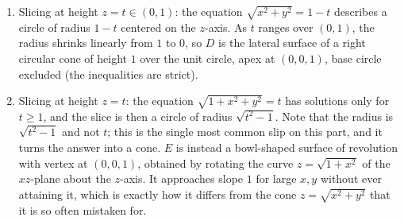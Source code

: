 \begin{exercisesolution}
\begin{enumerate}[label=\textbf{(\alph*)}]
\begin{center}
    \end{center}
  \item Slicing at height $z=t \in (0,1)$: the equation $\sqrt{x^2+y^2} = 1-t$ describes a circle
    of radius $1-t$ centered on the $z$-axis. As $t$ ranges over $(0,1)$, the radius shrinks
    linearly from $1$ to $0$, so $D$ is the lateral surface of a right circular cone of height $1$
    over the unit circle, apex at $(0,0,1)$, base circle excluded (the inequalities are strict).
  \item Slicing at height $z=t$: the equation $\sqrt{1+x^2+y^2}=t$ has solutions only for
    $t \geq 1$, and the slice is then a circle of radius $\sqrt{t^2-1}$. Note that the radius is
    $\sqrt{t^2-1}$ and not $t$; this is the single most common slip on this part, and it turns the
    answer into a cone. $E$ is instead a bowl-shaped surface of revolution with vertex at
    $(0,0,1)$, obtained by rotating the curve $z = \sqrt{1+x^2}$ of the $xz$-plane about the
    $z$-axis. It approaches
    slope $1$ for large $x,y$ without ever attaining it, which is exactly how it differs from the
    cone $z = \sqrt{x^2+y^2}$ that it is so often mistaken for.

\end{enumerate}
\end{exercisesolution}
